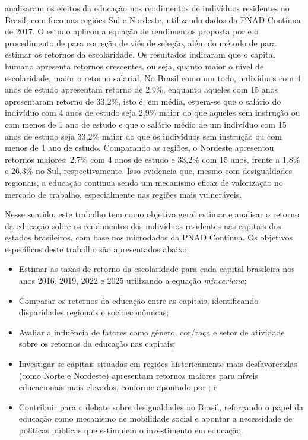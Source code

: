 \documentclass[12pt,a4paper,header]{abnt}
\begin{document}
 analisaram os efeitos da educação nos rendimentos de indivíduos residentes no Brasil, com foco nas regiões Sul e Nordeste, utilizando dados da PNAD Contínua de 2017. O estudo aplicou a equação de rendimentos proposta por  e o procedimento de  para correção de viés de seleção, além do método de  para estimar os retornos da escolaridade. Os resultados indicaram que o capital humano apresenta retornos crescentes, ou seja, quanto maior o nível de escolaridade, maior o retorno salarial. No Brasil como um todo, indivíduos com 4 anos de estudo apresentam retorno de 2,9\%, enquanto aqueles com 15 anos apresentaram retorno de 33,2\%, isto é, em média, espera-se que o salário do indivíduo com 4 anos de estudo seja 2,9\% maior do que aqueles sem instrução ou com menos de 1 ano de estudo e que o salário médio de um indivíduo com 15 anos de estudo seja 33,2\% maior do que os indivíduos sem instrução ou com menos de 1 ano de estudo. Comparando as regiões, o Nordeste apresentou retornos maiores: 2,7\% com 4 anos de estudo e 33,2\% com 15 anos, frente a 1,8\% e 26,3\% no Sul, respectivamente. Isso evidencia que, mesmo com desigualdades regionais, a educação continua sendo um mecanismo eficaz de valorização no mercado de trabalho, especialmente nas regiões mais vulneráveis.


Nesse sentido, este trabalho tem como objetivo geral estimar e analisar o retorno da educação sobre os rendimentos dos indivíduos residentes nas capitais dos estados brasileiros, com base nos microdados da PNAD Contínua. Os objetivos específicos deste trabalho são apresentados abaixo:

\begin{itemize}
    \item Estimar as taxas de retorno da escolaridade para cada capital brasileira nos anos 2016, 2019, 2022 e 2025 utilizando a equação \textit{minceriana};
    \item Comparar os retornos da educação entre as capitais, identificando disparidades regionais e socioeconômicas;
    \item Avaliar a influência de fatores como gênero, cor/raça e setor de atividade sobre os retornos da educação nas capitais;
    \item Investigar se capitais situadas em regiões historicamente mais desfavorecidas (como Norte e Nordeste) apresentam retornos maiores para níveis educacionais mais elevados, conforme apontado por ; e
    \item Contribuir para o debate sobre desigualdades no Brasil, reforçando o papel da educação como mecanismo de mobilidade social e apontar a necessidade de políticas públicas que estimulem o investimento em educação.
\end{itemize}
\end{document}

